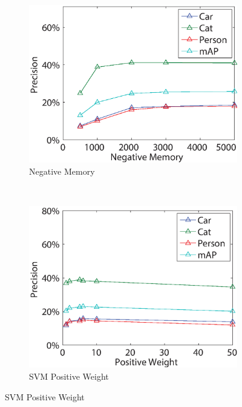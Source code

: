 \documentclass[10pt,twocolumn,letterpaper]{article}
\begin{document}
\begin{figure}
        ~ 
        \begin{subfigure}[b]{0.24\textwidth}
                \includegraphics[width=\textwidth]{figures/tuning/negative_memory.eps}
                \caption{Negative Memory}
                \label{fig:negative_weight}
        \end{subfigure}
        ~
        \begin{subfigure}[b]{0.24\textwidth}
        \includegraphics[width=\textwidth]{figures/tuning/positive_weight.eps}
        \caption{SVM Positive Weight}
        \label{fig:positive_weight}
        \end{subfigure}
        
        \vspace{3mm}
        

\end{figure}
\end{document}
